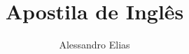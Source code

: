 \documentclass{book}
\begin{document}
\title{Apostila de Inglês}
\author{Alessandro Elias}

\frontmatter

\titlepage

\tableofcontents

\mainmatter


\end{document}
